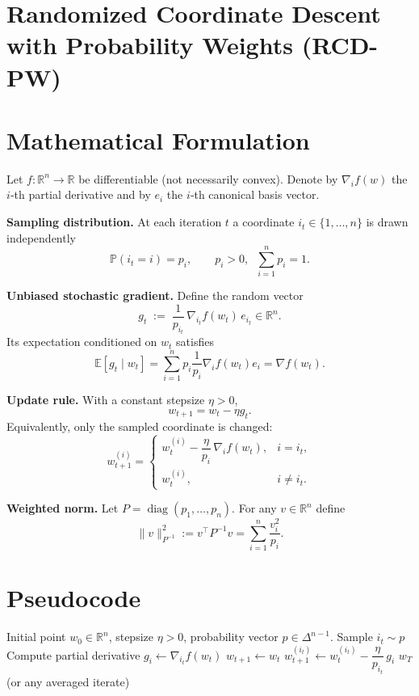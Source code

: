 \documentclass{article}
\begin{document}
\section*{Randomized Coordinate Descent with Probability Weights (RCD-PW)}

\section*{Mathematical Formulation}
Let $f:\mathbb{R}^{n}\rightarrow\mathbb{R}$ be differentiable (not necessarily convex).  
Denote by $\nabla_i f(w)$ the $i$‑th partial derivative and by $e_i$ the $i$‑th canonical basis vector.  

\medskip
\noindent\textbf{Sampling distribution.}  
At each iteration $t$ a coordinate $i_t\in\{1,\dots ,n\}$ is drawn independently
\[
\mathbb{P}(i_t=i)=p_i,\qquad p_i>0,\;\; \sum_{i=1}^{n}p_i=1 .
\]

\medskip
\noindent\textbf{Unbiased stochastic gradient.}
Define the random vector
\[
g_t \;:=\; \frac{1}{p_{i_t}}\,\nabla_{i_t} f(w_t)\,e_{i_t}\in\mathbb{R}^{n}.
\]
Its expectation conditioned on $w_t$ satisfies
\[
\mathbb{E}[g_t\mid w_t]=\sum_{i=1}^{n}p_i\frac{1}{p_i}\nabla_i f(w_t)e_i
               =\nabla f(w_t).                                   \tag{1}
\]

\medskip
\noindent\textbf{Update rule.}
With a constant stepsize $\eta>0$,
\[
w_{t+1}=w_t-\eta g_t .                                          \tag{2}
\]
Equivalently, only the sampled coordinate is changed:
\[
w_{t+1}^{(i)}=
\begin{cases}
w_{t}^{(i)}-\dfrac{\eta}{p_i}\,\nabla_i f(w_t), & i=i_t,\\[6pt]
w_{t}^{(i)},                                    & i\neq i_t .
\end{cases}
\]

\medskip
\noindent\textbf{Weighted norm.}  
Let $P=\operatorname{diag}(p_1,\dots ,p_n)$.  For any $v\in\mathbb{R}^{n}$ define
\[
\|v\|_{P^{-1}}^{2}:=v^{\top}P^{-1}v=\sum_{i=1}^{n}\frac{v_i^{2}}{p_i}.
\]

\section*{Pseudocode}
\begin{algorithm}[H]
\caption{Randomized Coordinate Descent with Probability Weights}
\begin{algorithmic}[1]
\Require Initial point $w_0\in\mathbb{R}^{n}$, stepsize $\eta>0$, probability vector $p\in\Delta^{n-1}$.
    \State Sample $i_t\sim p$ 
    \State Compute partial derivative $g_i \gets \nabla_{i_t} f(w_t)$
    \State $w_{t+1}\gets w_t$ 
    \State $w_{t+1}^{(i_t)} \gets w_t^{(i_t)}-\dfrac{\eta}{p_{i_t}}\,g_i$
\EndFor
\State \Return $w_T$ (or any averaged iterate)
\end{algorithmic}
\end{algorithm}
\end{document}
